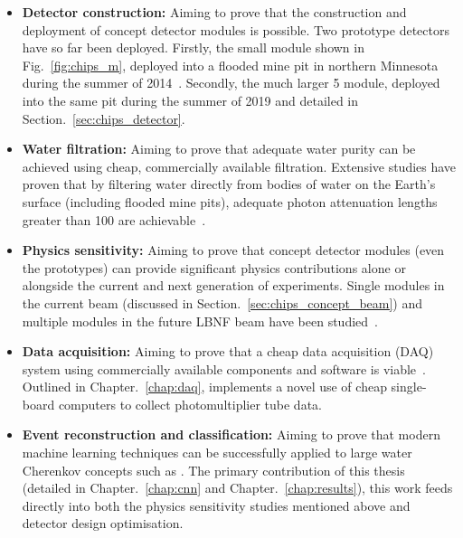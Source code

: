 \begin{itemize}
    \item \textbf{Detector construction:} Aiming to prove that the construction and deployment of
          \chips concept detector modules is possible. Two prototype detectors have so far been
          deployed. Firstly, the small \chipsm module shown in Fig.~\ref{fig:chips_m}, deployed
          into a flooded mine pit in northern Minnesota during the summer of 2014~\cite{perch2015,
          pfutznerProto2017, pfutzner2017}. Secondly, the much larger \unit{5}{}
          \chipsfive module, deployed into the same pit during the summer of 2019 and detailed in
          Section.~\ref{sec:chips_detector}.

    \item \textbf{Water filtration:} Aiming to prove that adequate water purity can be achieved
          using cheap, commercially available filtration. Extensive studies have proven that by
          filtering water directly from bodies of water on the Earth's surface (including flooded
          mine pits), adequate photon attenuation lengths greater than \unit{100}{} are
          achievable~\cite{amat2017, campbell2020}.

    \item \textbf{Physics sensitivity:} Aiming to prove that \chips concept detector modules (even
          the prototypes) can provide significant physics contributions alone or alongside the
          current and next generation of experiments. Single modules in the current \numi beam
          (discussed in Section.~\ref{sec:chips_concept_beam}) and multiple modules in the future
          LBNF beam have been studied~\cite{pfutzner2017, adde2016, lang2015}.

    \item \textbf{Data acquisition:} Aiming to prove that a cheap data acquisition (DAQ) system
          using commercially available components and software is viable~\cite{eijk2018}. Outlined
          in Chapter.~\ref{chap:daq}, \chips implements a novel use of cheap single-board
          computers to collect photomultiplier tube data.

    \item \textbf{Event reconstruction and classification:} Aiming to prove that modern machine
          learning techniques can be successfully applied to large water Cherenkov concepts such
          as \chips. The primary contribution of this thesis (detailed in Chapter.~\ref{chap:cnn}
          and Chapter.~\ref{chap:results}), this work feeds directly into both the physics
          sensitivity studies mentioned above and detector design optimisation.
\end{itemize}

